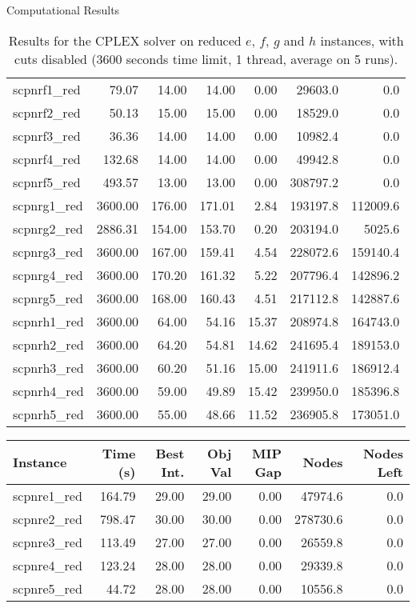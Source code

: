 \documentclass[a4paper,12pt]{mydeitesi_eng}
\begin{document}
\begin{chapter}{Computational Results}
\begin{table}[h]
\begin{center}
\begin{tabular}{l|r|r|r|r|r|r}
scpnrf1\_red & 79.07 & 14.00 & 14.00 & 0.00 & 29603.0 & 0.0 \\ 
scpnrf2\_red & 50.13 & 15.00 & 15.00 & 0.00 & 18529.0 & 0.0 \\ 
scpnrf3\_red & 36.36 & 14.00 & 14.00 & 0.00 & 10982.4 & 0.0 \\ 
scpnrf4\_red & 132.68 & 14.00 & 14.00 & 0.00 & 49942.8 & 0.0 \\ 
scpnrf5\_red & 493.57 & 13.00 & 13.00 & 0.00 & 308797.2 & 0.0 \\ 
\hline

scpnrg1\_red & 3600.00 & 176.00 & 171.01 & 2.84 & 193197.8 & 112009.6 \\ 
scpnrg2\_red & 2886.31 & 154.00 & 153.70 & 0.20 & 203194.0 & 5025.6 \\ 
scpnrg3\_red & 3600.00 & 167.00 & 159.41 & 4.54 & 228072.6 & 159140.4 \\ 
scpnrg4\_red & 3600.00 & 170.20 & 161.32 & 5.22 & 207796.4 & 142896.2 \\ 
scpnrg5\_red & 3600.00 & 168.00 & 160.43 & 4.51 & 217112.8 & 142887.6 \\ 
\hline

scpnrh1\_red & 3600.00 & 64.00 & 54.16 & 15.37 & 208974.8 & 164743.0 \\ 
scpnrh2\_red & 3600.00 & 64.20 & 54.81 & 14.62 & 241695.4 & 189153.0 \\ 
scpnrh3\_red & 3600.00 & 60.20 & 51.16 & 15.00 & 241911.6 & 186912.4 \\ 
scpnrh4\_red & 3600.00 & 59.00 & 49.89 & 15.42 & 239950.0 & 185396.8 \\ 
scpnrh5\_red & 3600.00 & 55.00 & 48.66 & 11.52 & 236905.8 & 173051.0 \\ 

\end{tabular}
\end{center}
\caption{Results for the CPLEX solver on reduced $e$, $f$, $g$ and $h$ instances, with cuts disabled (3600 seconds time limit, 1 thread, average on 5  runs).}
\label{tab:ResultCPLEXNoCuts}
\end{table}


\begin{table}[h]
\begin{center}
\begin{tabular}{l|r|r|r|r|r|r}
\textbf{Instance} & \textbf{Time (s)} & \textbf{Best Int.} & \textbf{Obj Val} & \textbf{MIP Gap} & \textbf{Nodes} & \textbf{Nodes Left}\\
\hline
scpnre1\_red & 164.79 & 29.00 & 29.00 & 0.00 & 47974.6 & 0.0 \\ 
scpnre2\_red & 798.47 & 30.00 & 30.00 & 0.00 & 278730.6 & 0.0 \\ 
scpnre3\_red & 113.49 & 27.00 & 27.00 & 0.00 & 26559.8 & 0.0 \\ 
scpnre4\_red & 123.24 & 28.00 & 28.00 & 0.00 & 29339.8 & 0.0 \\ 
scpnre5\_red & 44.72 & 28.00 & 28.00 & 0.00 & 10556.8 & 0.0 \\
\hline
 

\end{tabular}
\end{center}
\end{table}
\end{chapter}
\end{document}
